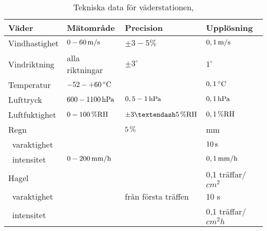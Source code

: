 \begin{table}[htdp]
\caption{Tekniska data för väderstationen, \cite{datasheet_weathertransmitter}}
\begin{center}
\begin{tabular}{|l | l l l|}
\hline
\textbf{Väder} & \textbf{Mätområde} %
 & \textbf{Precision} %
 & \textbf{Upplösning} \\ %
\hline
\rule{0pt}{3ex}Vindhastighet & $\unit[0-60]{m/s}$ & $\pm 3-5\%$ & $\unit[0,1]{m/s}$ \\ 
\rule{0pt}{3ex}Vindriktning & alla riktningar & $\pm 3^{\circ}$ & $1^{\circ}$ \\
\rule{0pt}{3ex}Temperatur & $\unit[-52-+60]{^{\circ}C}$ & & $\unit[0,1]{^{\circ}C}$ \\
\rule{0pt}{3ex}Lufttryck & $\unit[600-1100]{hPa}$ & $\unit[0,5-1]{hPa}$ & $\unit[0,1]{hPa}$ \\
\rule{0pt}{3ex}Luftfuktighet & $\unit[0-100]{\%RH}$ & $\unit[\pm3–5]{\%RH}$ & $\unit[0,1]{\%RH}$ \\
\rule{0pt}{3ex}Regn &  & $\unit[5]{\%}$ & \unit[0,01]{mm} \\
~varaktighet & & & $\unit[10]{s}$\\
~intensitet & $\unit[0-200]{mm/h}$ & & $\unit[0,1]{mm/h}$ \\
\rule{0pt}{3ex}Hagel &  &  & 0,1 träffar/$\unit{cm^2}$ \\
~varaktighet & & från första träffen & 10 s\\
~intensitet & & & 0,1 träffar/$\unit{cm^2h}$\\
\hline
\end{tabular}
\end{center}
\label{default}
\end{table}
